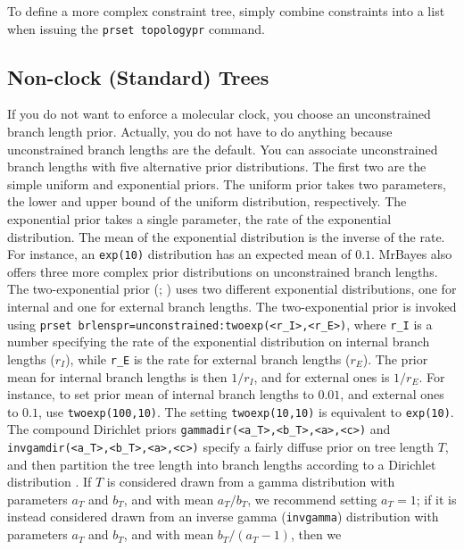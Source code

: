 \documentclass[12pt]{book}
\begin{document}
To define a more complex constraint tree, simply combine constraints into a list when issuing the
\texttt{prset topologypr} command.

\subsection{Non-clock (Standard) Trees}

If you do not want to enforce a molecular clock, you choose an unconstrained branch length prior.
Actually, you do not have to do anything because unconstrained branch lengths are the default. You
can associate unconstrained branch lengths with five alternative prior distributions. The first two
are the simple uniform and exponential priors. The uniform prior takes two parameters, the lower
and upper bound of the uniform distribution, respectively. The exponential prior takes a single
parameter, the rate of the exponential distribution. The mean of the exponential distribution is
the inverse of the rate. For instance, an \texttt{exp(10)} distribution has an expected mean of
$0.1$.  MrBayes also offers three more complex prior distributions on unconstrained branch lengths.
The two-exponential prior (\citet{yang05}; \citet{yang07}) uses two different exponential
distributions, one for internal and one for external branch lengths. The two-exponential prior is
invoked using \texttt{prset brlenspr=unconstrained:twoexp(<r\_I>,<r\_E>)}, where \texttt{r\_I} is a
number specifying the rate of the exponential distribution on internal branch lengths ($r_{I}$),
while \texttt{r\_E} is the rate for external branch lengths ($r_{E}$). The prior mean for internal
branch lengths is then $1/r_{I}$, and for external ones is $1/r_{E}$. For instance, to set prior
mean of internal branch lengths to $0.01$, and external ones to $0.1$, use \texttt{twoexp(100,10)}.
The setting \texttt{twoexp(10,10)} is equivalent to \texttt{exp(10)}. The compound Dirichlet priors
\texttt{gammadir(<a\_T>,<b\_T>,<a>,<c>)} and \texttt{invgamdir(<a\_T>,<b\_T>,<a>,<c>)} specify a
fairly diffuse prior on tree length $T$, and then partition the tree length into branch lengths
according to a Dirichlet distribution \citep{rannala12}. If $T$ is considered drawn from a gamma
distribution with parameters $a_{T}$ and $b_{T}$, and with mean $a_{T}/b_{T}$, we recommend setting
$a_{T} = 1$; if it is instead considered drawn from an inverse gamma (\texttt{invgamma})
distribution with parameters $a_{T}$ and $b_{T}$, and with mean $b_{T}/(a_{T} - 1)$, then we
\end{document}

